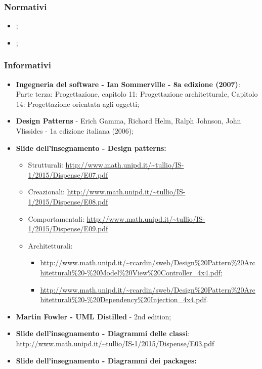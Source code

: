 \subsubsection{Normativi}
\begin{itemize}
	\item \textit{\NdPv};
	\item \textit{\AdRvDue};
\end{itemize}
\subsubsection{Informativi}
\begin{itemize}
	\item \textbf{Ingegneria del software - Ian Sommerville - 8a edizione (2007)}: \\
	Parte terza: Progettazione, capitolo 11: Progettazione architetturale, Capitolo 14: Progettazione orientata agli oggetti;
	\item \textbf{Design Patterns} - Erich Gamma, Richard Helm, Ralph Johnson, John Vlissides - 1a edizione italiana (2006);
	\item \textbf{Slide dell'insegnamento - Design patterns:}
	\begin{itemize}
		\item Strutturali: \url{http://www.math.unipd.it/~tullio/IS-1/2015/Dispense/E07.pdf}
		\item Creazionali: \url{http://www.math.unipd.it/~tullio/IS-1/2015/Dispense/E08.pdf}
		\item Comportamentali: \url{http://www.math.unipd.it/~tullio/IS-1/2015/Dispense/E09.pdf}
		\item Architetturali:
			\begin{itemize}
				\item \url{http://www.math.unipd.it/~rcardin/sweb/Design\%20Pattern\%20Architetturali\%20-\%20Model\%20View\%20Controller_4x4.pdf};
				\item \url{http://www.math.unipd.it/~rcardin/sweb/Design\%20Pattern\%20Architetturali\%20-\%20Dependency\%20Injection_4x4.pdf}.
			\end{itemize} 
	\end{itemize}
	\item \textbf{Martin Fowler - UML Distilled} - 2nd edition;
	\item \textbf{Slide dell'insegnamento - Diagrammi delle classi}: \\
		\url{http://www.math.unipd.it/~tullio/IS-1/2015/Dispense/E03.pdf}
	\item \textbf{Slide dell'insegnamento - Diagrammi dei packages:} \\

\end{itemize}
